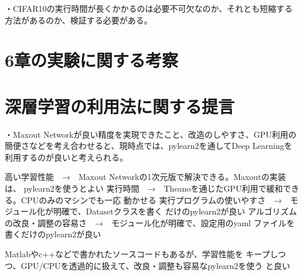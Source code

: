 ・CIFAR10の実行時間が長くかかるのは必要不可欠なのか、それとも短縮する方法があるのか、検証する必要がある。\\
\section{6章の実験に関する考察}

\section{深層学習の利用法に関する提言}
・Maxout Networkが良い精度を実現できたこと、改造のしやすさ、GPU利用の簡便さなどを考え合わせると、現時点では、pylearn2を通してDeep Learningを利用するのが良いと考えられる。

高い学習性能　→　Maxout Networkの1次元版で解決できる。Maxoutの実装は、 pylearn2を使うとよい
実行時間　→　Theanoを通じたGPU利用で緩和できる。CPUのみのマシンでも一応 動かせる
実行プログラムの使いやすさ　→　モジュール化が明確で、Datasetクラスを書く だけのpylearn2が良い
アルゴリズムの改良・調整の容易さ　→　モジュール化が明確で、設定用のyaml ファイルを書くだけのpylearn2が良い 

Matlabやc++などで書かれたソースコードもあるが、学習性能を キープしつつ、GPU/CPUを透過的に扱えて、改良・調整も容易なpylearn2を使う と良い 
